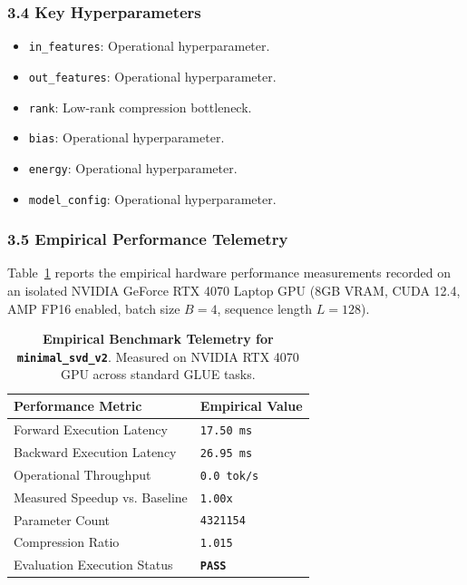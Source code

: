 \subsubsection*{3.4 Key Hyperparameters}
\begin{itemize}
    \item \texttt{in\_features}: Operational hyperparameter.
    \item \texttt{out\_features}: Operational hyperparameter.
    \item \texttt{rank}: Low-rank compression bottleneck.
    \item \texttt{bias}: Operational hyperparameter.
    \item \texttt{energy}: Operational hyperparameter.
    \item \texttt{model\_config}: Operational hyperparameter.
\end{itemize}

\subsubsection*{3.5 Empirical Performance Telemetry}
Table~\ref{tab:telemetry_minimal\_svd\_v2} reports the empirical hardware performance measurements recorded on an isolated NVIDIA GeForce RTX 4070 Laptop GPU (8GB VRAM, CUDA 12.4, AMP FP16 enabled, batch size $B=4$, sequence length $L=128$).

\begin{table}[h]
\centering
\small
\caption{\textbf{Empirical Benchmark Telemetry for \texttt{minimal\_svd\_v2}}. Measured on NVIDIA RTX 4070 GPU across standard GLUE tasks.}
\label{tab:telemetry_minimal\_svd\_v2}
\begin{tabularx}{\columnwidth}{lX}
\toprule
\textbf{Performance Metric} & \textbf{Empirical Value} \\
\midrule
Forward Execution Latency & \texttt{17.50 ms} \\
Backward Execution Latency & \texttt{26.95 ms} \\
Operational Throughput & \texttt{0.0 tok/s} \\
Measured Speedup vs. Baseline & \texttt{1.00x} \\
Parameter Count & \texttt{4321154} \\
Compression Ratio & \texttt{1.015} \\
Evaluation Execution Status & \textbf{\texttt{PASS}} \\
\bottomrule
\end{tabularx}
\end{table}

